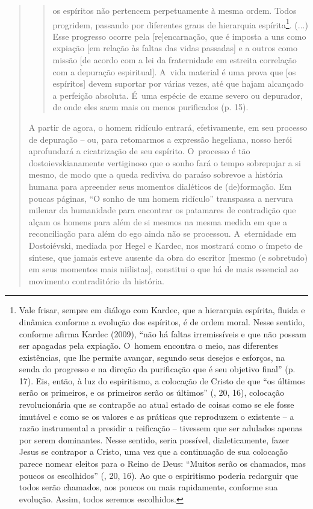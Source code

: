 {\begin{quote}
\begin{quote}
os espíritos não pertencem perpetuamente à mesma ordem. Todos progridem,
passando por diferentes graus de hierarquia espírita\footnote{Vale
  frisar, sempre em diálogo com Kardec, que a hierarquia espírita,
  fluida e dinâmica conforme a evolução dos espíritos, é de ordem moral.
  Nesse sentido, conforme afirma Kardec (2009), ``não há faltas
  irremissíveis e que não possam ser apagadas pela expiação. O~homem
  encontra o meio, nas diferentes existências, que lhe permite avançar,
  segundo seus desejos e esforços, na senda do progresso e na direção da
  purificação que é seu objetivo final'' (p. 17). Eis, então, à luz do
  espiritismo, a colocação de Cristo de que ``os últimos serão os
  primeiros, e os primeiros serão os últimos'' (, 20, 16),
  colocação revolucionária que se contrapõe ao atual estado de coisas
  como se ele fosse imutável e como se os valores e as práticas que
  reproduzem o existente -- a razão instrumental a presidir a reificação
  -- tivessem que ser adulados apenas por serem dominantes. Nesse
  sentido, seria possível, dialeticamente, fazer Jesus se contrapor a
  Cristo, uma vez que a continuação de sua colocação parece nomear
  eleitos para o Reino de Deus: ``Muitos serão os chamados, mas poucos
  os escolhidos'' (, 20, 16). Ao que o espiritismo poderia
  redarguir que todos serão chamados, aos poucos ou mais rapidamente,
  conforme sua evolução. Assim, todos seremos escolhidos.}. (...) Esse
progresso ocorre pela {[}re{]}encarnação, que é imposta a uns como
expiação {[}em relação às faltas das vidas passadas{]} e a outros como
missão {[}de acordo com a lei da fraternidade em estreita correlação com
a depuração espiritual{]}. A~vida material é uma prova que {[}os
espíritos{]} devem suportar por várias vezes, até que hajam alcançado a
perfeição absoluta. É~uma espécie de exame severo ou depurador, de onde
eles saem mais ou menos purificados (p. 15).
\end{quote}

A partir de agora, o homem ridículo entrará, efetivamente, em seu
processo de depuração -- ou, para retomarmos a expressão hegeliana,
nosso herói aprofundará a cicatrização de seu espírito. O~processo é tão
dostoievskianamente vertiginoso que o sonho fará o tempo sobrepujar a si
mesmo, de modo que a queda rediviva do paraíso sobrevoe a história
humana para apreender seus momentos dialéticos de (de)formação. Em
poucas páginas, ``O sonho de um homem ridículo'' transpassa a nervura
milenar da humanidade para encontrar os patamares de contradição que
alçam os homens para além de si mesmos na mesma medida em que a
reconciliação para além do ego ainda não se processou. A~eternidade em
Dostoiévski, mediada por Hegel e Kardec, nos mostrará como o ímpeto de
síntese, que jamais esteve ausente da obra do escritor {[}mesmo (e
sobretudo) em seus momentos mais niilistas{]}, constitui o que há de
mais essencial ao movimento contraditório da história.


\end{quote}}
